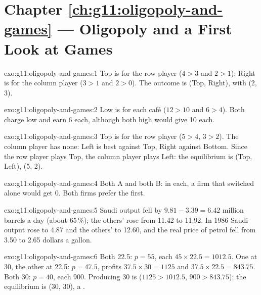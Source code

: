 \section*{Chapter \ref{ch:g11:oligopoly-and-games} --- Oligopoly and a First Look at Games}

\begin{solution}{exo:g11:oligopoly-and-games:1}
Top is  for the row player ($4 > 3$ and $2 > 1$); Right is  for the column player ($3 > 1$ and $2 > 0$). The outcome is (Top, Right), with  (2, 3).
\end{solution}

\begin{solution}{exo:g11:oligopoly-and-games:2}
Low is  for each café ($12 > 10$ and $6 > 4$). Both charge low and earn 6 each, although both high would give 10 each.
\end{solution}

\begin{solution}{exo:g11:oligopoly-and-games:3}
Top is  for the row player ($5 > 4$, $3 > 2$). The column player has none: Left is best against Top, Right against Bottom. Since the row player plays Top, the column
player plays Left: the equilibrium is (Top, Left),  (5, 2).
\end{solution}

\begin{solution}{exo:g11:oligopoly-and-games:4}
Both A and both B: in each, a firm that switched alone would get 0. Both firms prefer the first.
\end{solution}

\begin{solution}{exo:g11:oligopoly-and-games:5}
Saudi output fell by $9.81 - 3.39 = 6.42$ million barrels a day (about 65\,\%); the others' rose from 11.42 to 11.92. In 1986 Saudi output rose to 4.87 and the others' to 12.60,
and the real price of petrol fell from 3.50 to 2.65 dollars a gallon.
\end{solution}

\begin{solution}{exo:g11:oligopoly-and-games:6}
Both 22.5: $p = 55$, each $45 \times 22.5 = 1012.5$. One at 30, the other at 22.5: $p = 47.5$, profits $37.5 \times 30 = 1125$ and $37.5 \times 22.5 = 843.75$. Both 30: $p = 40$,
each 900. Producing 30 is  ($1125 > 1012.5$, $900 > 843.75$); the equilibrium is (30, 30), a .
\end{solution}

